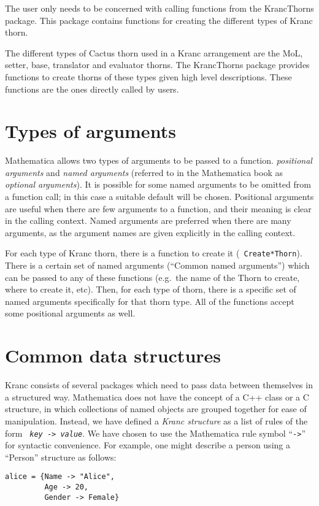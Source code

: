 \documentclass{report}
\begin{document}
The user only needs to be concerned with calling functions from the
KrancThorns package.  This package contains functions for creating the
different types of Kranc thorn.

The different types of Cactus thorn used in a Kranc arrangement are
the MoL, setter, base, translator and evaluator thorns. The
KrancThorns package provides functions to create thorns of these types
given high level descriptions.  These functions are the ones directly
called by users.

\section{Types of arguments}

Mathematica allows two types of arguments to be passed to a function.
{\em positional arguments} and {\em named arguments} (referred to in
the Mathematica book as {\em optional arguments}).  It is possible for
some named arguments to be omitted from a function call; in this case
a suitable default will be chosen.  Positional arguments are useful
when there are few arguments to a function, and their meaning is clear
in the calling context.  Named arguments are preferred when there are
many arguments, as the argument names are given explicitly in the
calling context.

For each type of Kranc thorn, there is a function to create it ({\tt
Create*Thorn}).  There is a certain set of named arguments (``Common
named arguments'') which can be passed to any of these functions
(e.g.~the name of the Thorn to create, where to create it, etc).
Then, for each type of thorn, there is a specific set of named
arguments specifically for that thorn type.  All of the functions
accept some positional arguments as well.
%

\section{Common data structures}

Kranc consists of several packages which need to pass data between
themselves in a structured way.  Mathematica does not have the concept
of a C++ class or a C structure, in which collections of named objects
are grouped together for ease of manipulation.  Instead, we have
defined a {\em Kranc structure} as a list of rules of the form {\tt
{\it key} -> {\it value}}.  We have chosen to use the Mathematica rule
symbol ``{\tt ->}'' for syntactic convenience.
%
For example, one might describe a person using a ``Person'' structure
as follows:
%
\begin{center}
\begin{minipage}{0.8 \textwidth}
\begin{verbatim}
alice = {Name -> "Alice",
         Age -> 20,
         Gender -> Female}
\end{verbatim}
\end{minipage}
\end{center}
\end{document}
